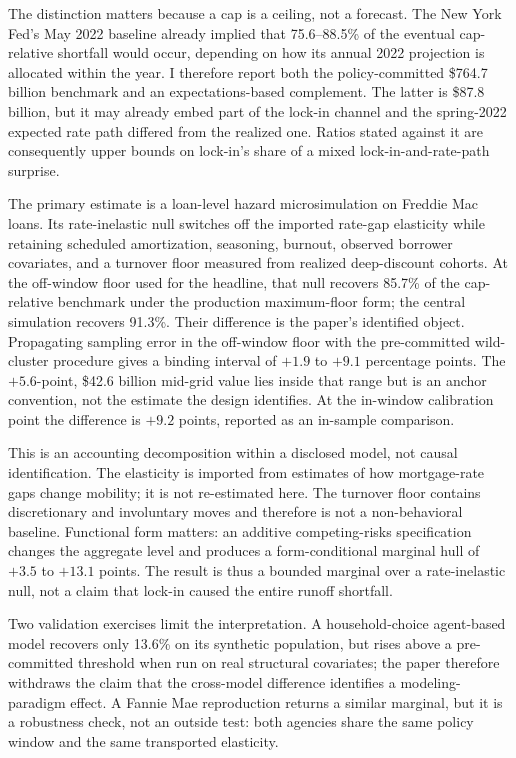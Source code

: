 \documentclass[12pt]{article}
\begin{document}
The distinction matters because a cap is a ceiling, not a forecast. The New York
Fed's May 2022 baseline already implied that 75.6--88.5\% of the eventual
cap-relative shortfall would occur, depending on how its annual 2022 projection
is allocated within the year. I therefore report both the policy-committed
\$764.7 billion benchmark and an expectations-based complement. The latter is
\$87.8 billion, but it may already embed part of the lock-in channel and the
spring-2022 expected rate path differed from the realized one. Ratios stated
against it are consequently upper bounds on lock-in's share of a mixed
lock-in-and-rate-path surprise.

The primary estimate is a loan-level hazard microsimulation on Freddie Mac
loans. Its rate-inelastic null switches off the imported rate-gap elasticity
while retaining scheduled amortization, seasoning, burnout, observed borrower
covariates, and a turnover floor measured from realized deep-discount cohorts.
At the off-window floor used for the headline, that null recovers 85.7\% of the
cap-relative benchmark under the production maximum-floor form; the central
simulation recovers 91.3\%. Their difference is the paper's identified object.
Propagating sampling error in the off-window floor with the pre-committed
wild-cluster procedure gives a binding interval of $+1.9$ to $+9.1$ percentage
points. The $+5.6$-point, \$42.6 billion mid-grid value lies inside that range
but is an anchor convention, not the estimate the design identifies. At the
in-window calibration point the difference is $+9.2$ points, reported as an
in-sample comparison.

This is an accounting decomposition within a disclosed model, not causal
identification. The elasticity is imported from estimates of how mortgage-rate
gaps change mobility; it is not re-estimated here. The turnover floor contains
discretionary and involuntary moves and therefore is not a non-behavioral
baseline. Functional form matters: an additive competing-risks specification
changes the aggregate level and produces a form-conditional marginal hull of
$+3.5$ to $+13.1$ points. The result is thus a bounded marginal over a
rate-inelastic null, not a claim that lock-in caused the entire runoff
shortfall.

Two validation exercises limit the interpretation. A household-choice
agent-based model recovers only 13.6\% on its synthetic population, but rises
above a pre-committed threshold when run on real structural covariates; the
paper therefore withdraws the claim that the cross-model
difference identifies a modeling-paradigm effect. A Fannie Mae reproduction
returns a similar marginal, but it is a robustness check, not an outside test:
both agencies share the same policy window and the same transported elasticity.
\end{document}
